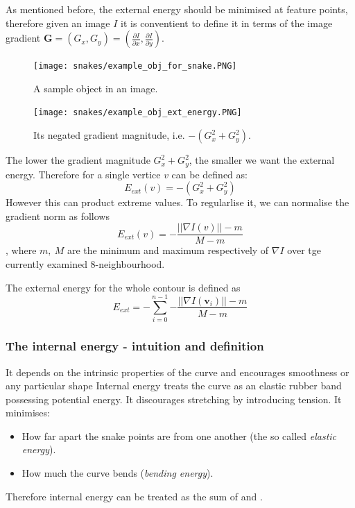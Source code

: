 \documentclass[a4paper]{article}
\begin{document}
As mentioned before, the external energy should be minimised at feature points, therefore given an image $I$ it is conventient to define it in terms of the image gradient $\textbf{G}=(G_x,G_y) = \left(\tfrac{\partial I}{\partial x},\tfrac{\partial I}{\partial y}\right)$.
\begin{multicols}{2}
\begin{figure}[H]
	\centering %
    	\texttt{[image: snakes/example\_obj\_for\_snake.PNG]}
    \caption{A sample object in an image.}
\end{figure}
\columnbreak
\begin{figure}[H]
	\centering %
    	\texttt{[image: snakes/example\_obj\_ext\_energy.PNG]}
    \caption{Its negated gradient magnitude, i.e. $-\left(G_x^2 + G_y^2 \right)$.}
\end{figure}
\end{multicols}
The lower the gradient magnitude $G_x^2 + G_y^2$, the smaller we want the external energy. Therefore for a single vertice $v$ can be defined as:
\[
    E_{ext}(v) = -\left(G_x^2 + G_y^2 \right)
\]
However this can product extreme values. To regularlise it, we can normalise the gradient norm as follows
\begin{equation}
    E_{ext}(v) = -\frac{\left| \left| \nabla I(v)  \right| \right| -m}{M-m}
\end{equation}
, where $m,\ M$ are the minimum and maximum respectively of $\nabla I$ over tge currently examined 8-neighbourhood.
\begin{definition}
The external energy for the whole contour is defined as
\begin{equation}
    E_{ext} = -\sum\limits_{i=0}^{n-1}{-\frac{\left| \left| \nabla I(\textbf{v}_i)  \right| \right| -m}{M-m}}
    \label{eq:snake_e_ext}
\end{equation}
\end{definition}


\subsubsection{The internal energy - intuition and definition}

It depends on the intrinsic properties of the curve and encourages smoothness or any particular shape Internal energy treats the curve as an elastic rubber band possessing  potential energy. It discourages stretching by introducing tension. It minimises:
\begin{itemize}
    \item How far apart the snake points are from one another (the so called \textit{elastic energy}).
    \item How much the curve bends (\textit{bending energy}).
\end{itemize}
Therefore internal energy can be treated as the sum of  and .
\end{document}
